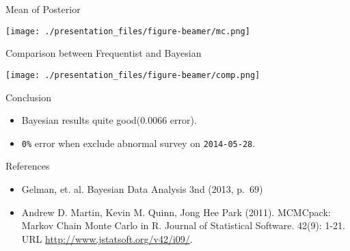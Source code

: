 \documentclass[ignorenonframetext,]{beamer}
\makeatletter
\def\maxwidth{\ifdim\Gin@nat@width>\linewidth\linewidth\else\Gin@nat@width\fi}
\def\maxheight{\ifdim\Gin@nat@height>\textheight0.8\textheight\else\Gin@nat@height\fi}
\renewcommand{\includegraphics}[2][]{%
    \Oldincludegraphics[#1,width=\maxwidth,height=\maxheight,keepaspectratio]{#2}}
\makeatother
\begin{document}
\begin{frame}{Mean of Posterior}

\texttt{[image: ./presentation\_files/figure-beamer/mc.png]}

\end{frame}

\begin{frame}{Comparison between Frequentist and Bayesian}

\texttt{[image: ./presentation\_files/figure-beamer/comp.png]}

\end{frame}

\begin{frame}{Conclusion}

\begin{itemize}
\itemsep1pt\parskip0pt
\item
  Bayesian results quite good(0.0066 error).
\item
  \texttt{0\%} error when exclude abnormal survey on
  \texttt{2014-05-28}.
\end{itemize}

\end{frame}

\begin{frame}{References}

\begin{itemize}
\itemsep1pt\parskip0pt
\item
  Gelman, et. al. Bayesian Data Analysis 3nd (2013, p.~69)
\item
  Andrew D. Martin, Kevin M. Quinn, Jong Hee Park (2011). MCMCpack:
  Markov Chain Monte Carlo in R. Journal of Statistical Software. 42(9):
  1-21. URL \url{http://www.jstatsoft.org/v42/i09/}.
\end{itemize}

\end{frame}
\end{document}
